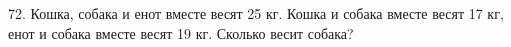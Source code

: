 72. Кошка, собака и енот вместе весят 25 кг. Кошка и собака вместе весят 17 кг, енот и собака вместе весят 19 кг. Сколько весит собака?\\
